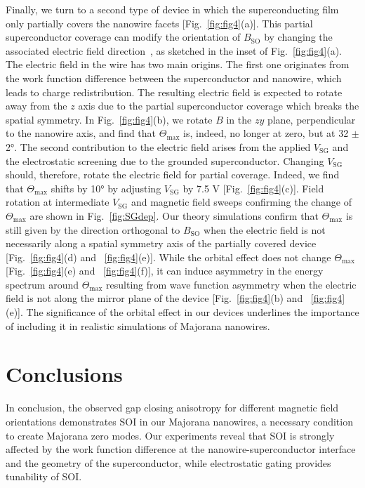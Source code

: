 Finally, we turn to a second type of device in which the superconducting film only partially covers the nanowire facets [Fig.~\ref{fig:fig4}(a)].
This partial superconductor coverage can modify the orientation of $B_{\mathrm{SO}}$ by changing the associated electric field direction~\cite{Vuik2016}, as sketched in the inset of Fig.~\ref{fig:fig4}(a).
The electric field in the wire has two main origins.
The first one originates from the work function difference between the superconductor and nanowire, which leads to charge redistribution.
The resulting electric field is expected to rotate away from the $z$ axis due to the partial superconductor coverage which breaks the spatial symmetry.
In Fig.~\ref{fig:fig4}(b), we rotate $B$ in the $zy$ plane, perpendicular to the nanowire axis, and find that $\Theta_{\mathrm{max}}$ is, indeed, no longer at zero, but at 32 $\pm$ \ang{2}.
The second contribution to the electric field arises from the applied $V_{\mathrm{SG}}$ and the electrostatic screening due to the grounded superconductor.
Changing $V_{\mathrm{SG}}$ should, therefore, rotate the electric field for partial coverage.
Indeed, we find that $\Theta_{\mathrm{max}}$ shifts by \ang{10} by adjusting $V_{\mathrm{SG}}$ by 7.5 V [Fig.~\ref{fig:fig4}(c)].
Field rotation at intermediate $V_{\mathrm{SG}}$ and magnetic field sweeps confirming the change of $\Theta_{\mathrm{max}}$ are shown in Fig.~\ref{fig:SGdep}.
Our theory simulations confirm that $\Theta_{\mathrm{max}}$ is still given by the direction orthogonal to $B_{\mathrm{SO}}$ when the electric field is not necessarily along a \mbox{spatial} symmetry axis of the partially covered device [Fig.~\ref{fig:fig4}(d) and ~\ref{fig:fig4}(e)].
While the orbital effect does not change $\Theta_{\mathrm{max}}$ [Fig.~\ref{fig:fig4}(e) and ~\ref{fig:fig4}(f)], it can induce asymmetry in the energy spectrum around $\Theta_{\mathrm{max}}$ resulting from wave function asymmetry when the electric field is not along the mirror plane of the device [Fig.~\ref{fig:fig4}(b) and ~\ref{fig:fig4}(e)].
The significance of the orbital effect in our devices underlines the importance of including it in realistic simulations of Majorana nanowires.

\section{Conclusions}
In conclusion, the observed gap closing anisotropy for different magnetic field orientations demonstrates SOI in our Majorana nanowires, a necessary condition to create Majorana zero modes.
Our experiments reveal that SOI is strongly affected by the work function difference at the nanowire-superconductor interface and the geometry of the superconductor, while electrostatic gating provides tunability of SOI.

